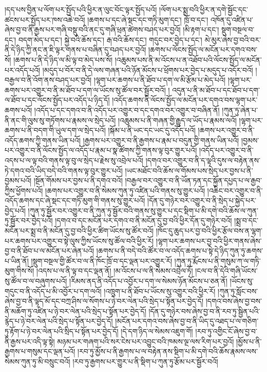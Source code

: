 །དད་པས་བྱིན་པ་ལོག་པར་སྤྱོད་པའི་ཕྱིར་ན་ལུང་བོང་ལྟར་སྤྱོད་པའོ། །ལོག་པར་སྨྲ་བའི་ཕྱིར་ན་དགེ་སྦྱོང་དང་ཚངས་པར་སྤྱོད་པར་ཁས་འཆེ་བའོ། །ཆགས་པ་དང་ཞེ་སྡང་དང་གཏི་མུག་དང་། ཁྲོ་བ་དང་། འཁོན་དུ་འཛིན་པ་ཞེས་བྱ་བ་ནི་རྒྱས་པར་གཞི་བསྡུ་བའི་ནང་དུ་གཞི་ཕྲན་ཚེགས་བཤད་པར་བྱའོ། །མི་རྟག་པ་དང་། སྡུག་བསྔལ་བ་དང་། བདག་མེད་པ་དང་། སྐྱེ་བའི་ཆོས་དང་། རྒ་བའི་ཆོས་དང་། གདུང་བར་བྱེད་པ་དང་། མེ་མུར་ཞེས་བྱ་བའི་བར་ནི་དེ་ཉིད་ཀྱི་ནང་ན་ཇི་ལྟར་གནས་པ་བཞིན་དུ་བཤད་པར་བྱའོ། །ཆགས་པ་ལོངས་སྤྱོད་ལ་མངོན་པར་དགའ་བས་སོ། །ཆགས་པ་ནི་དེ་ཉིད་ལ་མི་ལྟ་བ་མེད་པས་སོ། །འཆུམས་པས་ནི་མ་འོངས་པ་ན་འཐོབ་པའི་ལོངས་སྤྱོད་ལ་མངོན་པར་འདོད་པའོ། །མདུད་པ་བོར་བ་ནི་དེ་ལས་གཞན་པའི་ཉོན་མོངས་པ་ཕྲོགས་པར་བྱེད་པ་མདུད་པ་འདོར་བའོ། །བརྒྱལ་བ་ནི་འོག་ནས་བཤད་པར་བྱའོ། །ལྷག་པར་ཆགས་པ་ནི་ཐོབ་པ་དག་ལ་མི་རྩོམ་པ་མེད་པའོ། །ལྷག་པར་ཆགས་པར་འགྱུར་བ་ནི་མ་ཐོབ་པ་དག་ལ་ཡོངས་སུ་ཚོལ་བར་སྦྱོར་བའོ། །
འདུན་པ་ནི་མ་ཐོབ་པ་དང་ཐོབ་པ་དག་ལ་ཐོབ་པ་དང་ལོངས་སྤྱོད་པར་འདོད་པ་ཉིད་དོ། །འདོད་ཆགས་ནི་ལོངས་སྤྱོད་ལ་མངོན་པར་དགའ་བས་ལྷག་པར་ཆགས་པའོ། །འདོད་པ་དང་དགའ་བ་ནི་འདོད་པར་འགྱུར་བ་དང་དགའ་བར་འགྱུར་བ་བཞིན་ནོ། །ཀུན་ཏུ་ཞེན་པ་ནི་ནང་གི་ལུས་སུ་གཏོགས་པ་རྣམས་ལ་སྲེད་པའོ། །འཆུམས་པ་ནི་གཞན་གྱི་རྒྱུད་ལ་ཡོད་པ་རྣམས་ལའོ། །ལྷག་པར་ཆགས་པ་ནི་བདག་གི་ཡུལ་དག་ལ་སྲེད་པའོ། །སྐོམ་པ་ནི་ཡང་དང་ཡང་དུ་འདོད་པའོ། །ཆགས་པར་འགྱུར་བ་ནི་འདོད་ཆགས་ཀྱི་གནས་ཡིན་པའོ། །རྒྱགས་པར་འགྱུར་བ་ནི་རྒྱགས་པ་རྣམ་པ་བདུན་གྱི་གནས་ཡིན་པའོ། །བྱམས་པར་འགྱུར་བ་ནི་ལོངས་སྤྱོད་ལ་འདོད་པ་རྣམ་པ་སྣ་ཚོགས་ཀྱི་གནས་ལྟ་བུར་གྱུར་པའོ། །འདོད་པར་འགྱུར་བ་ནི་འདས་པ་ལ་ལྟ་བའི་གནས་ལྟ་བུ་ལ་སྲེད་པ་རྗེས་སུ་འབྲེལ་པའོ། །དགའ་བར་འགྱུར་བ་ནི་ད་ལྟའི་དུས་ལ་བརྟེན་ནས་ཏེ་དགའ་བའི་ཡིད་བདེ་བའི་གནས་ལྟ་བུར་གྱུར་པའོ། །ཡང་མཐོང་བའི་ཆོས་ལ་གོམས་པས་སྲེད་པར་བྱས་པ་ནི་བྱམས་པའོ། །སྔོན་གོམས་པར་བྱས་པ་ནི་དགའ་བའོ། །བརྒྱལ་བར་འགྱུར་བ་ནི་ཡོན་ཏན་དང་སྐྱོན་དཔྱད་པ་ལ་རྒྱབ་ཀྱིས་ཕྱོགས་པའོ། །ཆགས་པར་འགྱུར་བ་ནི་སེམས་ཀུན་ཏུ་འཛིན་པའི་གནས་སུ་གྱུར་པའོ། །འཆིང་བར་འགྱུར་བ་ནི་འདོད་ཆགས་དང་ཞེ་སྡང་དང་གཏི་མུག་གི་གནས་སུ་གྱུར་པའོ། །དོན་དུ་གཉེར་བར་འགྱུར་བ་ནི་སྲེད་པ་སྐྱེད་པར་བྱེད་པའོ། །ཀུན་ཏུ་སྦྱོར་བར་འགྱུར་བ་ནི་ཀུན་ཏུ་སྦྱོར་བའི་གནས་སུ་གྱུར་པ་དང་སྡིག་པ་མི་དགེ་བའི་ཆོས་ལ་ཀུན་ཏུ་སྦྱོར་བར་བྱེད་པའོ། །དགའ་བ་དང་མངོན་པར་དགའ་བ་ནི་མངོན་དུ་བྱ་བའི་ཕྱིར་དོན་དུ་གཉེར་བའོ། །སྨྲ་བ་དང་མངོན་པར་སྨྲ་བ་ནི་མངོན་དུ་བྱ་བའི་ཕྱིར་ཚིག་ཡོངས་སུ་ཚོར་བའོ། །ཁོང་དུ་ཆུད་པར་བྱ་བའི་ཕྱིར་རྩོལ་བས་ན་ལྷག་པར་ཆགས་པར་འགྱུར་བ་སྟེ་ལུས་ཀྱིས་ཡོངས་སུ་ཚོལ་བའི་ཕྱིར་རོ། །ལྷག་པར་ཆགས་པར་བྱ་བའི་ཕྱིར་གནས་ཞེས་བྱ་བ་ནི་ཐོབ་པ་ལ་མངོན་པར་ཞེན་པའོ། །ཆགས་པ་ནི་བདེ་བའི་ཚོར་བ་ལ་འདོད་ཆགས་པ་སྟེ་དེ་ཉིད་ཀུན་ཏུ་ཆགས་པ་ཡིན་ནོ། །སྡུག་བསྔལ་གྱི་ཚོར་བ་ལ་ནི་ཁོང་ཁྲོ་བ་དང་ལྡན་པར་འགྱུར་རོ། །ཀུན་ཏུ་རྨོངས་པ་ནི་གསུམ་ཀ་ལ་གཏི་མུག་གིས་སོ། །འདས་པ་ལ་ནི་ལྟ་བ་དང་ལྡན་ནོ། །མ་འོངས་པ་ལ་ནི་སེམས་འབྲེལ་ཏོ། །ངལ་བ་ནི་དེའི་གཞི་ཡོངས་སུ་ཚོལ་བ་ལ་བཞུགས་པའོ། །རིམས་ནད་ནི་འདོད་པ་འབྱོར་པ་དག་ལ་སེམས་ཉོན་མོངས་པ་ཅན་ནོ། །ཡོངས་སུ་གདུང་བ་ནི་འདོད་པ་མི་འབྱོར་པ་དག་ལའོ། །འཁྲུག་པ་ནི་ཐོབ་པ་ཡོངས་སུ་འགྱུར་བའི་ཕྱིར་རོ། །ཀུན་ཏུ་སློང་བས་ཞེས་བྱ་བ་ནི་ལྟད་མོ་དང་བཀྲ་ཤིས་ལ་སོགས་པ་ཉེ་བར་ལེན་པའི་སྲེད་པ་སྟོན་པར་བྱེད་དོ། །དགའ་བས་ཞེས་བྱ་བས་ནི་མཆོག་ཏུ་འཛིན་པ་ཉེ་བར་ལེན་པའི་སྲེད་པ་སྟོན་པར་བྱེད་དོ། །དོན་དུ་གཉེར་བས་ཞེས་བྱ་བ་ནི་རབ་ཏུ་སྦྱིན་པའི་རྙེད་པ་ཉེ་བར་ལེན་པའི་སྲེད་པ་སྟོན་པར་བྱེད་དོ། །མངོན་པར་དགའ་བས་ཞེས་བྱ་བ་ནི་ཡིད་དུ་འཐད་པ་ལ་གཅིག་ཏུ་རྟོག་པ་ཉེ་བར་ལེན་པའི་སྲིད་པ་སྟོན་པར་བྱེད་དོ། །དེ་དག་ཉིད་ལ་སེམས་འཇུག་གོ། །རབ་ཏུ་འགྱིང་ངོ་ཞེས་བྱ་བ་ནི་རྒྱས་པར་འདི་ལྟ་སྟེ། མཉམ་པར་གཞག་པའི་སར་ངེས་པར་འབྱུང་བའི་ཁམས་ལྔ་ལས་རིག་པར་བྱའོ། །མྱོས་པ་ནི་རྒྱགས་པ་གསུམ་དང་ལྡན་པའོ། །རབ་ཏུ་མྱོས་པ་ནི་རྒྱགས་པ་ལ་བརྟེན་ནས་སྡིག་པ་མི་དགེ་བའི་ཆོས་རྣམས་ལས་སེམས་ཀུན་ཏུ་མི་བསྲུང་བའོ། །རབ་ཏུ་རྒྱགས་པར་གྱུར་པ་ནི་སྡིག་པ་ཀུན་ཏུ་རྩོམ་པར་སྦྱོར་བའོ། 